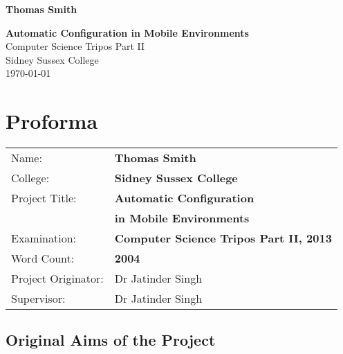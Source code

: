 \documentclass[12pt,twoside,notitlepage]{report}
\begin{document}





\pagestyle{empty}

\hfill{\LARGE \bf Thomas Smith}

\vspace*{60mm}
\begin{center}
\Huge
{\bf Automatic Configuration in Mobile Environments} \\
\vspace*{5mm}
Computer Science Tripos Part II \\
\vspace*{5mm}
Sidney Sussex College \\
\vspace*{5mm}
\today  %
\end{center}

\cleardoublepage


\setcounter{page}{1}
\pagestyle{plain}

\chapter*{Proforma}

{\large
\begin{tabular}{ll}
Name:               & \bf Thomas Smith	\\
College:            & \bf Sidney Sussex College	\\
Project Title:      & \bf Automatic Configuration \\ &\bf in Mobile Environments	\\
Examination:        & \bf Computer Science Tripos Part II, 2013 	\\
Word Count:         & \bf 2004\footnotemark[1] \\
Project Originator: & Dr Jatinder Singh		\\
Supervisor:         & Dr Jatinder Singh		\\ 
\end{tabular}
}



\section*{Original Aims of the Project}
\end{document}
